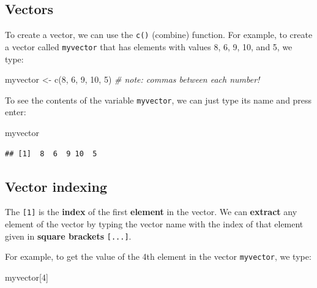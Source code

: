 \documentclass[
]{book}
\newenvironment{Shaded}{\begin{snugshade}}{\end{snugshade}}
\newcommand{\CommentTok}[1]{\textcolor[rgb]{0.56,0.35,0.01}{\textit{#1}}}
\newcommand{\DecValTok}[1]{\textcolor[rgb]{0.00,0.00,0.81}{#1}}
\newcommand{\FunctionTok}[1]{\textcolor[rgb]{0.00,0.00,0.00}{#1}}
\newcommand{\NormalTok}[1]{#1}
\newcommand{\OtherTok}[1]{\textcolor[rgb]{0.56,0.35,0.01}{#1}}
\begin{document}
\hypertarget{vectors}{%
\subsection{Vectors}\label{vectors}}

To create a vector, we can use the \texttt{c()} (combine) function. For example, to create a vector called \texttt{myvector} that has elements with values 8, 6, 9, 10, and 5, we type:

\begin{Shaded}
\begin{Highlighting}[]
\NormalTok{myvector }\OtherTok{\textless{}{-}} \FunctionTok{c}\NormalTok{(}\DecValTok{8}\NormalTok{, }\DecValTok{6}\NormalTok{, }\DecValTok{9}\NormalTok{, }\DecValTok{10}\NormalTok{, }\DecValTok{5}\NormalTok{) }\CommentTok{\# note: commas between each number!}
\end{Highlighting}
\end{Shaded}

To see the contents of the variable \texttt{myvector}, we can just type its name and press enter:

\begin{Shaded}
\begin{Highlighting}[]
\NormalTok{myvector}
\end{Highlighting}
\end{Shaded}

\begin{verbatim}
## [1]  8  6  9 10  5
\end{verbatim}

\hypertarget{vector-indexing}{%
\subsection{Vector indexing}\label{vector-indexing}}

The \texttt{{[}1{]}} is the \textbf{index} of the first \textbf{element} in the vector. We can \textbf{extract} any element of the vector by typing the vector name with the index of that element given in \textbf{square brackets} \texttt{{[}...{]}}.

For example, to get the value of the 4th element in the vector \texttt{myvector}, we type:

\begin{Shaded}
\begin{Highlighting}[]
\NormalTok{myvector[}\DecValTok{4}\NormalTok{]}
\end{Highlighting}
\end{Shaded}
\end{document}
